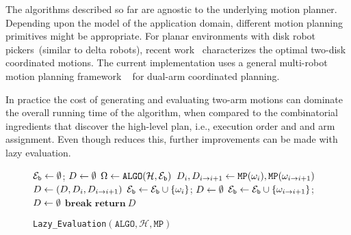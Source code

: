The algorithms described so far are agnostic to the underlying motion planner.
Depending upon the model of the application domain, different motion planning primitives might be appropriate. For planar environments with disk robot pickers~(similar to delta robots), recent work~\cite{kirkpatrick2016characterizing} characterizes the optimal two-disk coordinated motions. The current implementation uses a general multi-robot motion planning framework \drrtstar~\cite{Dobson:2017aa} for dual-arm coordinated planning.


In practice the cost of generating and evaluating two-arm motions can dominate the overall running time of the algorithm, when compared to the combinatorial ingredients that discover the high-level plan, i.e., execution order and and arm assignment. Even though \algo reduces this, further improvements can be made with lazy evaluation. 

\begin{wrapfigure}{r}{0.6\textwidth}
  \vspace{-0.5 in}
  \begin{minipage}{0.6\textwidth}
  \vspace{0pt} 
  \begin{algorithm}[H]
  \caption{{\tt Lazy\_Evaluation}$ (\mathtt{ALGO}, \mathcal{H}, \mathtt{MP}) $}
  \label{algo:lazy}
  $ \mathcal{E}_{\mathtt{b}}\leftarrow\emptyset $;  $ D \leftarrow \emptyset $\;
  {
      $ {{\Omega}}\leftarrow \mathtt{ALGO} ( \mathcal{H},   \mathcal{E}_{\mathtt{b}}  ) $\;
      {
          $ D_i,D_{i\rightarrow i+1} \leftarrow \mathtt{MP}({\omega}_i), \mathtt{MP}( {\omega}_{i\rightarrow{i+1}} ) $\;
          $ D\leftarrow (D,D_i,D_{i\rightarrow i+1} ) $\;
          {
              $ \mathcal{E}_{\mathtt{b}} \leftarrow \mathcal{E}_{\mathtt{b}}\cup \{{\omega}_i\}$; $ D \leftarrow \emptyset$\;
          }
          {
              $ \mathcal{E}_{\mathtt{b}} \leftarrow \mathcal{E}_{\mathtt{b}}\cup \{{\omega}_{i\rightarrow{i+1}}\}$; $D \leftarrow \emptyset $\;
          }
          \lIf{$ \D=\emptyset $}
          {
          $\mathbf{break}$
          }
      }
  }
  $\mathbf{return}\ D$
  \end{algorithm}
  \end{minipage}
  \vspace{-0.35in}
\end{wrapfigure}

